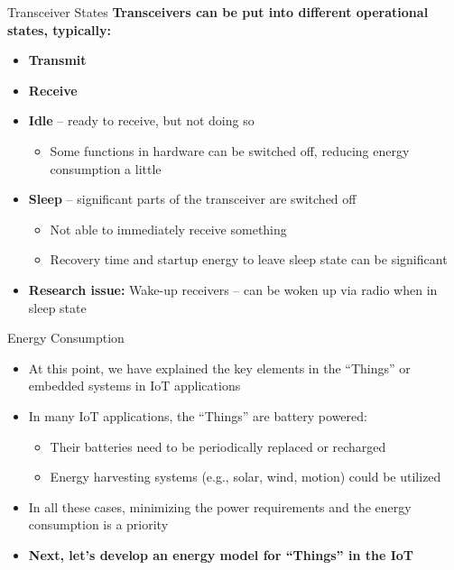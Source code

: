 \documentclass[aspectratio=169,11pt]{beamer}
\begin{document}
\begin{frame}{Transceiver States}
    \textbf{Transceivers can be put into different operational states, typically:}
    \begin{itemize}
        \item \textbf{Transmit}
        \item \textbf{Receive}
        \item \textbf{Idle} -- ready to receive, but not doing so
        \begin{itemize}
            \item Some functions in hardware can be switched off, reducing energy consumption a little
        \end{itemize}
        \item \textbf{Sleep} -- significant parts of the transceiver are switched off
        \begin{itemize}
            \item Not able to immediately receive something
            \item Recovery time and startup energy to leave sleep state can be significant
        \end{itemize}
        \item \textbf{Research issue:} Wake-up receivers -- can be woken up via radio when in sleep state
    \end{itemize}
\end{frame}

\begin{frame}{Energy Consumption}
    \begin{itemize}
        \item At this point, we have explained the key elements in the ``Things'' or embedded systems in IoT applications
        \item In many IoT applications, the ``Things'' are battery powered:
        \begin{itemize}
            \item Their batteries need to be periodically replaced or recharged
            \item Energy harvesting systems (e.g., solar, wind, motion) could be utilized
        \end{itemize}
        \item In all these cases, minimizing the power requirements and the energy consumption is a priority
        \item \textbf{Next, let's develop an energy model for ``Things'' in the IoT}
    \end{itemize}
\end{frame}
\end{document}
